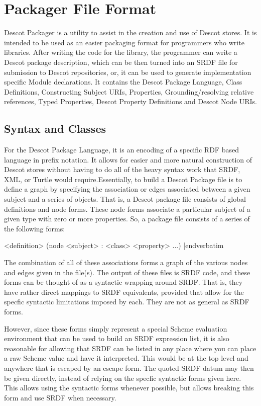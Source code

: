 \chapter{Packager File Format}{}%
Descot Packager is a utility to assist in the creation and use of Descot
stores. It is intended to be used as an easier packaging format for 
programmers who write libraries. After writing the code for the library,
the programmer can write a Descot package description, which can be 
then turned into an SRDF file for submission to Descot repositories, 
or, it can be used to generate implementation specific Module declarations.
It contains the Descot Package Language, Class Definitions, Constructing 
Subject URIs, Properties, Grounding/resolving relative references, Typed 
Properties, Descot Property Definitions and Descot Node URIs.

\section{Syntax and Classes}{}%
For the Descot Package Language, it is an encoding of a specific RDF
based language in prefix notation. It allows for easier and more natural 
construction of Descot stores without having to do all of the heavy syntax 
work that SRDF, XML, or Turtle would require.Essentially, to build a Descot 
Package file is to define a graph by specifying the association or edges 
associated between a given subject and a series of objects. That is, a Descot 
package file consists of global definitions and node forms. These node forms 
associate a particular subject of a given type with zero or more properties. 
So, a package file consists of a series of the following forms:

\medskip\verbatim
<definition>
(node <subject> : <class> <property> ...)
|endverbatim
\medskip

\noindent
The combination of all of these associations forms a graph of the 
various nodes and edges given in the file(s). The output of these 
files is SRDF code, and these forms can be thought of as a syntactic 
wrapping around SRDF. That is, they have rather direct mappings to 
SRDF equivalents, provided that allow for the specfic syntactic 
limitations imposed by each. They are not as general as SRDF forms.

However, since these forms simply represent a special Scheme evaluation 
environment that can be used to build an SRDF expression list, it is also 
reasonable for allowing that SRDF can be listed in any place where you 
can place a raw Scheme value and have it interpreted. This would be at the 
top level and anywhere that is escaped by an escape form. The quoted SRDF datum
may then be given directly, instead of relying on the specfic syntactic forms 
given here. This allows using the syntactic forms whenever possible, but
allows breaking this form and use SRDF when necessary.

